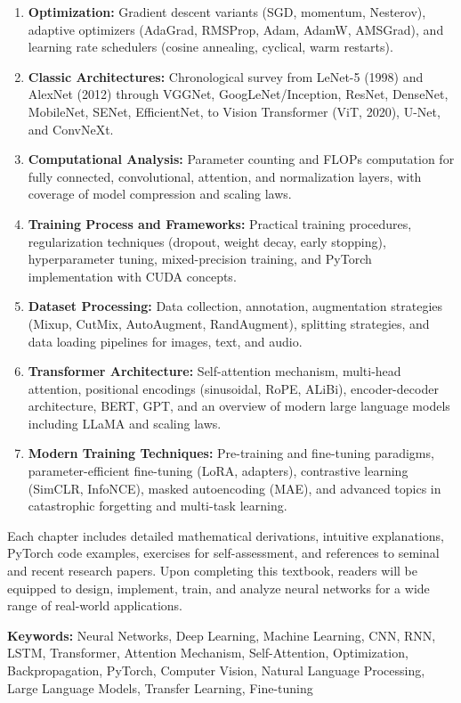 \begin{enumerate}
    \item \textbf{Optimization:} Gradient descent variants (SGD, momentum, Nesterov), adaptive optimizers (AdaGrad, RMSProp, Adam, AdamW, AMSGrad), and learning rate schedulers (cosine annealing, cyclical, warm restarts).
    
    \item \textbf{Classic Architectures:} Chronological survey from LeNet-5 (1998) and AlexNet (2012) through VGGNet, GoogLeNet/Inception, ResNet, DenseNet, MobileNet, SENet, EfficientNet, to Vision Transformer (ViT, 2020), U-Net, and ConvNeXt.
    
    \item \textbf{Computational Analysis:} Parameter counting and FLOPs computation for fully connected, convolutional, attention, and normalization layers, with coverage of model compression and scaling laws.
    
    \item \textbf{Training Process and Frameworks:} Practical training procedures, regularization techniques (dropout, weight decay, early stopping), hyperparameter tuning, mixed-precision training, and PyTorch implementation with CUDA concepts.
    
    \item \textbf{Dataset Processing:} Data collection, annotation, augmentation strategies (Mixup, CutMix, AutoAugment, RandAugment), splitting strategies, and data loading pipelines for images, text, and audio.
    
    \item \textbf{Transformer Architecture:} Self-attention mechanism, multi-head attention, positional encodings (sinusoidal, RoPE, ALiBi), encoder-decoder architecture, BERT, GPT, and an overview of modern large language models including LLaMA and scaling laws.
    
    \item \textbf{Modern Training Techniques:} Pre-training and fine-tuning paradigms, parameter-efficient fine-tuning (LoRA, adapters), contrastive learning (SimCLR, InfoNCE), masked autoencoding (MAE), and advanced topics in catastrophic forgetting and multi-task learning.
\end{enumerate}

Each chapter includes detailed mathematical derivations, intuitive explanations, PyTorch code examples, exercises for self-assessment, and references to seminal and recent research papers. Upon completing this textbook, readers will be equipped to design, implement, train, and analyze neural networks for a wide range of real-world applications.

\vspace{2cm}

\textbf{Keywords:} Neural Networks, Deep Learning, Machine Learning, CNN, RNN, LSTM, Transformer, Attention Mechanism, Self-Attention, Optimization, Backpropagation, PyTorch, Computer Vision, Natural Language Processing, Large Language Models, Transfer Learning, Fine-tuning

\newpage

